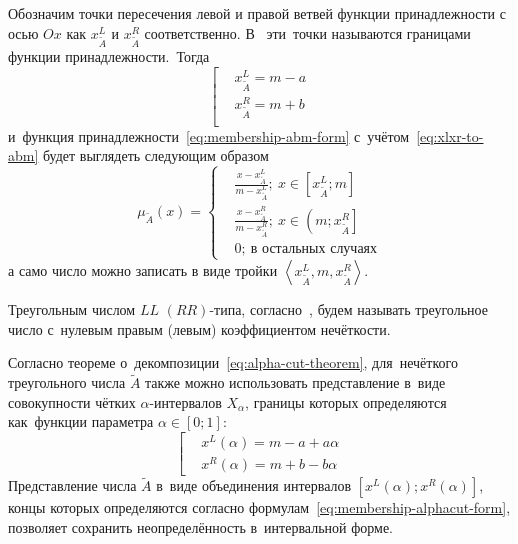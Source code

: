 Обозначим точки пересечения левой и правой ветвей функции принадлежности с осью $Ox$ как $x_{{\tilde{A}}}^{L}$ и $x_{{\tilde{A}}}^{R}$ соответственно. В~\cite{Borisov_Krumberg_Riga} эти~точки называются границами функции принадлежности.~Тогда
\begin{equation}
\label{eq:xlxr-to-abm}
	\left[ 
		\begin{aligned}
			 & x_{\tilde A}^L=m-a \\ 
			 & x_{\tilde A}^R=m+b \\ 
		 \end{aligned} 
 	\right.
\end{equation}
и~функция принадлежности~\eqref{eq:membership-abm-form} с~учётом~\eqref{eq:xlxr-to-abm} будет выглядеть следующим образом
\begin{equation}
\label{eq:membership-xlxr-form}
	\mu_{\tilde A}\left( x \right)=\left\{ 
	\begin{aligned}
		& \frac{x-x_{{\tilde{A}}}^{L}}{m-x_{{\tilde{A}}}^{L}};\ x\in \left[ x_{{\tilde{A}}}^{L};m \right] \\ 
		& \frac{x-x_{{\tilde{A}}}^{R}}{m-x_{{\tilde{A}}}^{R}};\ x\in \left( m;x_{{\tilde{A}}}^{R} \right] \\ 
		& 0;\ \text{в остальных случаях} 
	\end{aligned} 
	\right.
\end{equation}
а само число можно записать в виде тройки $\left\langle x_{{\tilde{A}}}^{L},m,x_{{\tilde{A}}}^{R} \right\rangle$.

\begin{mydef}
Треугольным числом $LL$ $\left( RR \right)$-типа, согласно~\cite{Vorontsov_PI}, будем называть треугольное число с~нулевым правым (левым) коэффициентом нечёткости.
\end{mydef}

Согласно теореме о~декомпозиции~\eqref{eq:alpha-cut-theorem}, для~нечёткого треугольного числа $\tilde{A}$ также можно использовать представление в~виде совокупности чётких $\alpha$-интервалов $X_\alpha$, границы которых определяются как~функции параметра $\alpha \in \left[ 0;1 \right]$:
\begin{equation}
\label{eq:membership-alphacut-form}
	\left[ 
		\begin{aligned}
			& {{x}^{L}}(\alpha )=m-a+a\alpha  \\ 
			& {{x}^{R}}(\alpha )=m+b-b\alpha
		 \end{aligned}
	\right.
\end{equation}
Представление числа $\tilde{A}$ в~виде объединения интервалов $\left[ {{x}^{L}}\left( \alpha  \right);{{x}^{R}}\left( \alpha  \right) \right]$, концы которых определяются согласно формулам~\eqref{eq:membership-alphacut-form}, позволяет сохранить неопределённость в~интервальной форме.

